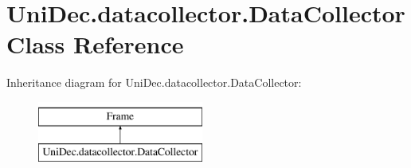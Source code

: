 \hypertarget{class_uni_dec_1_1datacollector_1_1_data_collector}{}\section{Uni\+Dec.\+datacollector.\+Data\+Collector Class Reference}
\label{class_uni_dec_1_1datacollector_1_1_data_collector}
Inheritance diagram for Uni\+Dec.\+datacollector.\+Data\+Collector\+:\begin{figure}[H]
\begin{center}
\leavevmode
\includegraphics[height=2.000000cm]{class_uni_dec_1_1datacollector_1_1_data_collector}
\end{center}
\end{figure}
